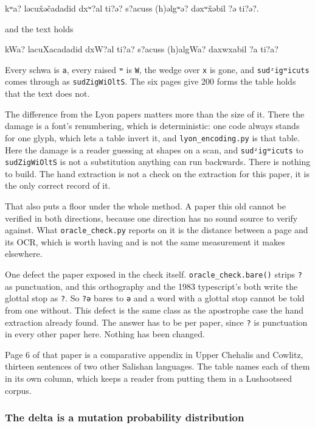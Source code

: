 kʷa? ləcux̌əčadadid dxʷ?al ti?ə? s?acuss (h)əlgʷə? dəxʷx̌əbil ?ə ti?ə?.

and the text holds

kWa? lacuXacadadid dxW?al ti?a? s?acuss (h)algWa? daxwxabil ?a ti?a?

Every schwa is \texttt{a}, every raised \texttt{ʷ} is \texttt{W}, the wedge over \texttt{x} is gone, and \texttt{sudᶻigʷicuts} comes through as \texttt{sud\allowbreak{}Zig\allowbreak{}Wi\allowbreak{}Olt\allowbreak{}S}. The six pages give 200 forms the table holds that the text does not.

The difference from the Lyon papers matters more than the size of it. There the damage is a font's renumbering, which is deterministic: one code always stands for one glyph, which lets a table invert it, and \texttt{lyon\_\allowbreak{}encoding.\allowbreak{}py} is that table. Here the damage is a reader guessing at shapes on a scan, and \texttt{sudᶻigʷicuts} to \texttt{sud\allowbreak{}Zig\allowbreak{}Wi\allowbreak{}Olt\allowbreak{}S} is not a substitution anything can run backwards. There is nothing to build. The hand extraction is not a check on the extraction for this paper, it is the only correct record of it.

That also puts a floor under the whole method. A paper this old cannot be verified in both directions, because one direction has no sound source to verify against. What \texttt{oracle\_\allowbreak{}check.\allowbreak{}py} reports on it is the distance between a page and its OCR, which is worth having and is not the same measurement it makes elsewhere.

One defect the paper exposed in the check itself. \texttt{oracle\_\allowbreak{}check.\allowbreak{}bare()} strips \texttt{?} as punctuation, and this orthography and the 1983 typescript's both write the glottal stop as \texttt{?}. So \texttt{?ə} bares to \texttt{ə} and a word with a glottal stop cannot be told from one without. This defect is the same class as the apostrophe case the hand extraction already found. The answer has to be per paper, since \texttt{?} is punctuation in every other paper here. Nothing has been changed.

Page 6 of that paper is a comparative appendix in Upper Chehalis and Cowlitz, thirteen sentences of two other Salishan languages. The table names each of them in its own column, which keeps a reader from putting them in a Lushootseed corpus.

\subsubsection{The delta is a mutation probability distribution}

